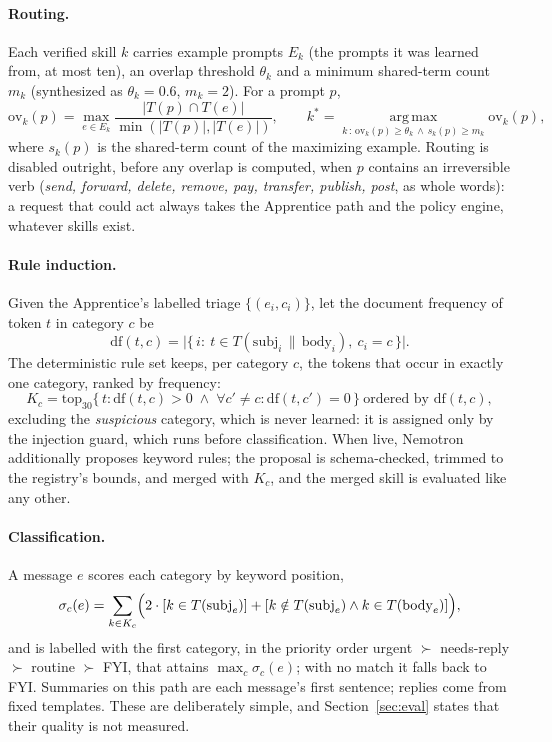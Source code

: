 \documentclass[11pt]{article}
\begin{document}
\paragraph{Routing.} Each verified skill $k$ carries example prompts $E_k$ (the prompts it was learned from, at most
ten), an overlap threshold $\theta_k$ and a minimum shared-term count $m_k$ (synthesized as $\theta_k=0.6$,
$m_k=2$). For a prompt $p$,
\begin{equation}
\mathrm{ov}_k(p)=\max_{e\in E_k}\frac{|T(p)\cap T(e)|}{\min(|T(p)|,|T(e)|)},\qquad
k^\ast=\operatorname*{arg\,max}_{k\,:\,\mathrm{ov}_k(p)\ge\theta_k\,\wedge\,s_k(p)\ge m_k}\mathrm{ov}_k(p),
\end{equation}
where $s_k(p)$ is the shared-term count of the maximizing example. Routing is disabled outright, before any
overlap is computed, when $p$ contains an irreversible verb (\emph{send, forward, delete, remove, pay, transfer, publish, post}, as whole
words): a request that could act always takes the Apprentice path and the policy engine, whatever skills exist.

\paragraph{Rule induction.} Given the Apprentice's labelled triage $\{(e_i,c_i)\}$, let the document frequency of
token $t$ in category $c$ be
\[
\mathrm{df}(t,c)=\bigl|\{\,i:\ t\in T(\mathrm{subj}_i\,\|\,\mathrm{body}_i),\ c_i=c\,\}\bigr|.
\]
The deterministic rule set keeps, per category $c$, the tokens that occur in exactly one category, ranked by
frequency:
\begin{equation}
K_c=\mathrm{top}_{30}\bigl\{\,t:\mathrm{df}(t,c)>0\;\wedge\;\forall c'\neq c:\mathrm{df}(t,c')=0\,\bigr\}\ \text{ordered by }\mathrm{df}(t,c),
\end{equation}
excluding the \emph{suspicious} category, which is never learned: it is assigned only by the injection guard, which
runs before classification. When live, Nemotron additionally proposes keyword rules; the proposal is schema-checked,
trimmed to the registry's bounds, and merged with $K_c$, and the merged skill is evaluated like any other.

\paragraph{Classification.} A message $e$ scores each category by keyword position,
\begin{equation}
\sigma_c(e)=\sum_{k\in K_c}\Bigl(2\cdot[k\in T(\mathrm{subj}_e)]+[k\notin T(\mathrm{subj}_e)\wedge k\in T(\mathrm{body}_e)]\Bigr),
\end{equation}
and is labelled with the first category, in the priority order urgent $\succ$ needs-reply $\succ$ routine $\succ$
FYI, that attains $\max_c\sigma_c(e)$; with no match it falls back to FYI. Summaries on this path are each message's
first sentence; replies come from fixed templates. These are deliberately simple, and Section~\ref{sec:eval} states
that their quality is not measured.
\end{document}
